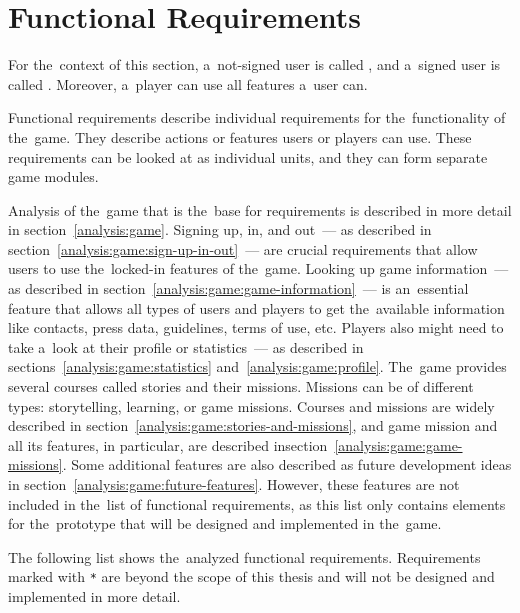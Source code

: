 \section{Functional Requirements}

For the~context of this section, a~not-signed user is called , and a~signed user is called .
Moreover, a~player can use all features a~user can. 

Functional requirements describe individual requirements for the~functionality of the~game.
They describe actions or features users or players can use.
These requirements can be looked at as individual units, and they can form separate game modules.

Analysis of the~game that is the~base for requirements is described in more detail in section~\ref{analysis:game}.
Signing up, in, and out~--- as described in section~\ref{analysis:game:sign-up-in-out}~--- are crucial requirements that allow users to use the~locked-in features of the~game.
Looking up game information~--- as described in section~\ref{analysis:game:game-information}~--- is an~essential feature that allows all types of users and players to get the~available information like contacts, press data, guidelines, terms of use, etc.
Players also might need to take a~look at their profile or statistics~--- as described in sections~\ref{analysis:game:statistics} and~\ref{analysis:game:profile}.
The~game provides several courses called stories and their missions.
Missions can be of different types: storytelling, learning, or game missions.
Courses and missions are widely described in section~\ref{analysis:game:stories-and-missions}, and game mission and all its features, in particular, are described in\linebreak{}section~\ref{analysis:game:game-missions}.
Some additional features are also described as future development ideas in section~\ref{analysis:game:future-features}.
However, these features are not included in the~list of functional requirements, as this list only contains elements for the~prototype that will be designed and implemented in the~game.

The following list shows the~analyzed functional requirements.
Requirements marked with \texttt{*} are beyond the scope of this thesis and will not be designed and implemented in more detail.

